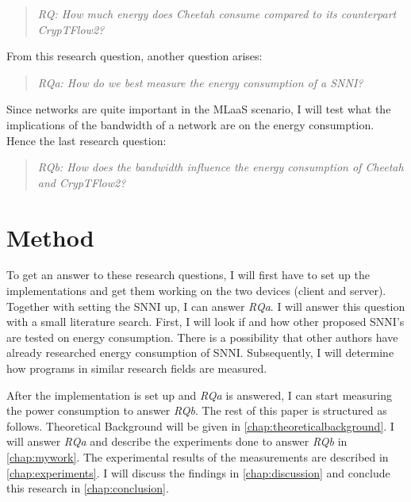 \documentclass[../thesis.tex]{subfiles}
\begin{document}
\begin{quote} \emph{RQ: How much energy does Cheetah consume compared to its counterpart CrypTFlow2?} \end{quote} 

\noindent From this research question, another question arises:

\begin{quote} \emph{RQa: How do we best measure the energy consumption of a SNNI?} \end{quote}

\noindent Since networks are quite important in the MLaaS scenario, I will test what the implications of the bandwidth of a network are on the energy consumption. Hence the last research question:

\begin{quote}
    \emph{RQb: How does the bandwidth influence the energy consumption of Cheetah and CrypTFlow2?}
\end{quote}


\section{Method}
To get an answer to these research questions, I will first have to set up the implementations and get them working on the two devices (client and server). Together with setting the SNNI up, I can answer \textit{RQa}. I will answer this question with a small literature search. First, I will look if and how other proposed SNNI's are tested on energy consumption. There is a possibility that other authors have already researched energy consumption of SNNI. Subsequently, I will determine how programs in similar research fields are measured.

After the implementation is set up and \textit{RQa} is answered, I can start measuring the power consumption to answer \textit{RQb}. The rest of this paper is structured as follows. Theoretical Background will be given in \autoref{chap:theoreticalbackground}. I will answer \textit{RQa} and describe the experiments done to answer \textit{RQb} in \autoref{chap:mywork}. The experimental results of the measurements are described in \autoref{chap:experiments}. I will discuss the findings in \autoref{chap:discussion} and conclude this research in \autoref{chap:conclusion}.

\end{document}
